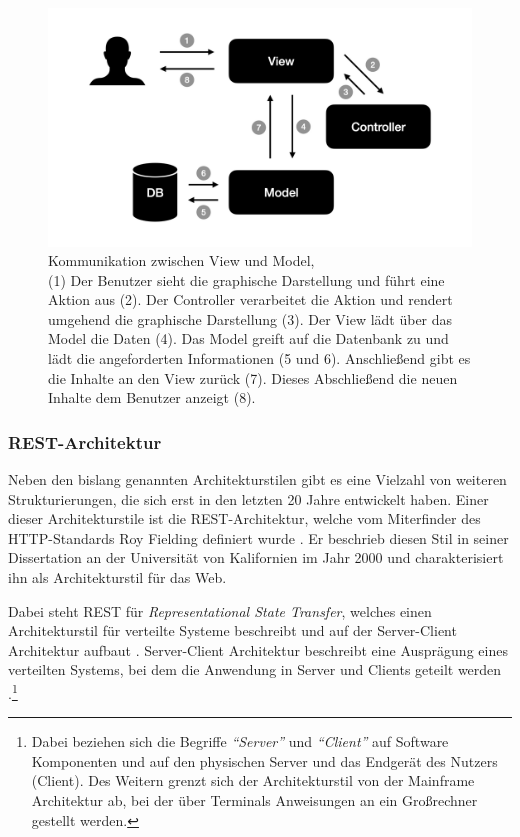  \begin{figure}
 	\centering
    \includegraphics[width=.6\textwidth]{Assets/Interaktionsorientiert.002}
	\caption[Kommunikation zwischen View und Model]{Kommunikation zwischen View und Model, \\ (1) Der Benutzer sieht die graphische Darstellung und führt eine Aktion aus (2). Der Controller verarbeitet die Aktion und rendert umgehend die graphische Darstellung (3). Der View lädt über das Model die Daten (4). Das Model greift auf die Datenbank zu und lädt die angeforderten Informationen (5 und 6). Anschließend gibt es die Inhalte an den View zurück (7). Dieses Abschließend die neuen Inhalte dem Benutzer anzeigt (8).}
    \label{fig:mvc-vm-kommunikation}
 \end{figure}

\subsubsection{REST-Architektur}
\label{sec:rest}

Neben den bislang genannten Architekturstilen gibt es eine Vielzahl von weiteren Strukturierungen, die sich erst in den letzten 20 Jahre entwickelt haben. Einer dieser Architekturstile ist die REST-Architektur, welche vom Miterfinder des HTTP-Standards Roy Fielding definiert wurde \parencite[][S. 128]{starke_effektive_2015}. Er beschrieb diesen Stil in seiner Dissertation an der Universität von Kalifornien im Jahr 2000 und charakterisiert ihn als Architekturstil für das Web.

Dabei steht REST für \textit{Representational State Transfer}, welches einen Architekturstil für verteilte Systeme beschreibt und auf der Server-Client Architektur aufbaut \parencite[][S. 76]{fielding_architectural_2000}. Server-Client Architektur beschreibt eine Ausprägung eines verteilten Systems, bei dem die Anwendung in Server und Clients geteilt werden \parencite[][S. 117]{starke_effektive_2015}.\footnote{Dabei beziehen sich die Begriffe \textit{\enquote{Server}} und \textit{\enquote{Client}} auf Software Komponenten und auf den physischen Server und das Endgerät des Nutzers (Client). Des Weitern grenzt sich der  Architekturstil von der Mainframe Architektur ab, bei der über Terminals Anweisungen an ein Großrechner gestellt werden.}

